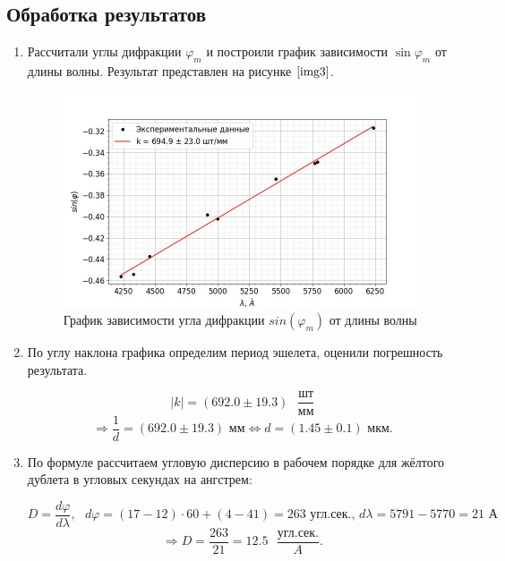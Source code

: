 \documentclass[a4paper,12pt]{article} %
\begin{document}
\newpage

\subsection{Обработка результатов}

\begin{enumerate}
    \item  Рассчитали углы дифракции $\varphi_m$ и построили график зависимости $\sin{\varphi_m}$ от длины волны. Результат представлен на рисунке $\ref{img3}$.

\begin{figure}[h]
    \begin{center}
        \includegraphics[width=16cm]{image1.jpg}
    \end{center}
    \caption{График зависимости угла дифракции $sin(\varphi_m)$ от длины волны }
    \label{img3}
\end{figure}

    \item По углу наклона графика определим период эшелета, оценили погрешность результата.

\[ |k| = (692.0 \pm 19.3) \text{ }\frac{\text{шт}}{\text{мм}} \]
\[ \Longrightarrow \frac{1}{d} = (692.0 \pm 19.3) \text{ мм} \Longleftrightarrow d = (1.45 \pm 0.1) \text{ мкм.}\]

    \item По формуле рассчитаем угловую дисперсию в рабочем порядке для жёлтого дублета в угловых секундах на ангстрем:

    \[ D=\frac{d\varphi}{d\lambda}, \text{ }d\varphi = (17-12)\cdot60+(4-41)=263 \text{ угл.сек., } d\lambda=5791-5770=21\text{ А}\]
    \[ \Longrightarrow D=\frac{263}{21} = 12.5\text{ }\frac{\text{угл.сек.}}{A}. \]


\end{enumerate}
\end{document}
